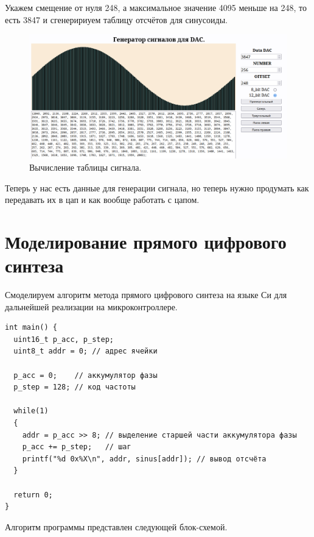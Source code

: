 	Укажем смещение от нуля 248, а максимальное значение 4095 меньше на 248, то есть 3847 и сгенеририуем таблицу отсчётов для синусоиды. 
	
	\begin{figure}[H]
    \centering
    \includegraphics[width=1\textwidth]{../image/lut.png}
    \caption{Вычисление таблицы сигнала.}
	\end{figure}
	
	Теперь у нас есть данные для генерации сигнала, но теперь нужно продумать как передавать их в цап и как вообще работать с цапом.
\section{Моделирование прямого цифрового синтеза}

Смоделируем алгоритм метода прямого цифрового синтеза на языке Си для дальнейшей реализации на микроконтроллере.

\begin{code}
\begin{verbatim}
int main() {
  uint16_t p_acc, p_step;
  uint8_t addr = 0; // адрес ячейки

  p_acc = 0;    // аккумулятор фазы
  p_step = 128; // код частоты

  while(1)
  {
    addr = p_acc >> 8; // выделение старшей части аккумулятора фазы
    p_acc += p_step;   // шаг
    printf("%d 0x%X\n", addr, sinus[addr]); // вывод отсчёта
  }

  return 0;
}
\end{verbatim}
\end{code}

	Алгоритм программы представлен следующей блок-схемой.
	
